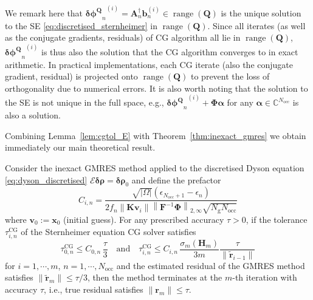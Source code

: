 \documentclass[hidelinks,onefignum,onetabnum]{siamart250211}
\newcommand{\C}{\mathbb{C}}
\newcommand{\range}{\operatorname{range}}
\newcommand{\Nocc}{N_{\mathrm{occ}}}
\newcommand{\Ng}{N_{\mathrm{g}}}
\newcommand{\taucg}{\tau^{\mathrm{CG}}}
\begin{document}
\begin{remark}\label{rmk:sternheimer_solution}
  We remark here that ${\bm{\delta \phi^Q}_n}^{(i)} = \bm A_n^{\dagger} \bm b_n^{(i)} \in \range(\bm Q)$ is the unique solution to the SE \eqref{eq:discretised_sternheimer} in $\range(\bm Q)$. Since all iterates (as well as the conjugate gradients, residuals) of CG algorithm all lie in $\range(\bm Q)$, ${\bm{\delta \phi^Q}_n}^{(i)}$ is thus also the solution that the CG algorithm converges to in exact arithmetic. In practical implementations, each CG iterate (also the conjugate gradient, residual) is projected onto $\range(\bm Q)$ to prevent the loss of orthogonality due to numerical errors. It is also worth noting that the solution to the SE is not unique in the full space, e.g., ${\bm{\delta \phi^Q}_n}^{(i)} + \bm \Phi \bm \alpha$ for any $\bm \alpha \in \C^{\Nocc}$ is also a solution.
\end{remark}

Combining Lemma~\ref{lem:cgtol_E} with Theorem~\ref{thm:inexact_gmres} we obtain immediately
our main theoretical result.
\begin{theorem}\label{thm:inexact_gmres_dyson}
  Consider the inexact GMRES method applied to the discretised Dyson equation \eqref{eq:dyson_discretised} $\bm{\mathcal E} \bm{\delta \rho} = \bm{\delta \rho}_0$ and define the prefactor
  \begin{equation}
      C_{i,n} = \dfrac{\sqrt{|\Omega|}(\epsilon_{\Nocc + 1} - \epsilon_n)}{2 f_n \left\| \bm K \bm v_i \right\| \left\| \bm{F}^{-1}\bm{\Phi} \right\|_{2,\infty} \sqrt{\Ng\Nocc} }
      \label{eqn:bound_prefactor}
  \end{equation}
  where $\bm v_0 := \bm x_0$ (initial guess).
  For any prescribed accuracy $\tau>0$,
  if the tolerance $\taucg_{i,n}$ of the Sternheimer equation CG solver satisfies
  \begin{equation}
      \taucg_{0,n} \leq C_{0,n} \, \dfrac{\tau}{3}
      \quad\text{and}\quad
      \taucg_{i,n} \leq C_{i,n} \, \dfrac{\sigma_m(\bm H_m)}{3m} \dfrac{\tau}{\|\widetilde{\bm r}_{i-1}\|}
  \end{equation}
  for $i=1,\cdots, m$, $n=1,\cdots, \Nocc$
  and the estimated residual of the GMRES method satisfies
  $\|\widetilde{\bm r}_m\| \leq \tau/3$, then the method terminates at
  the $m$-th iteration with accuracy $\tau$, i.e., true residual satisfies $\|\bm r_m\| \leq
  \tau$.
\end{theorem}
\end{document}
